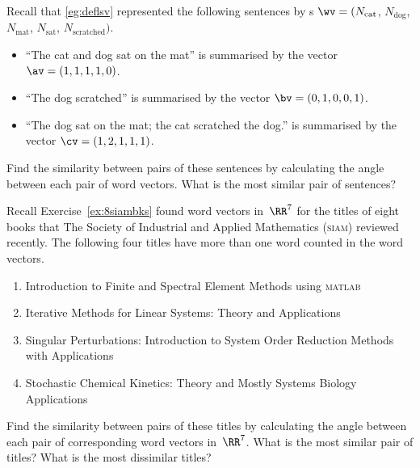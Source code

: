 \begin{exercise} \label{ex:} 
Recall that \autoref{eg:deflsv} represented the following sentences by s \(\wv=(N_{\text{cat}}\), \(N_{\text{dog}}\), \(N_{\text{mat}}\), \(N_{\text{sat}}\), \(N_{\text{scratched}})\).
\begin{itemize}
\item ``The cat and dog sat on the mat'' is summarised by the vector \(\av=(1,1,1,1,0)\).
\item ``The dog scratched'' is summarised by the vector \(\bv=(0,1,0,0,1)\).
\item  ``The dog sat on the mat; the cat scratched the dog.'' is summarised by the vector \(\cv=(1,2,1,1,1)\).
\end{itemize}
Find the similarity between pairs of these sentences by calculating the angle between each pair of word vectors.  
What is the most similar pair of sentences?

\end{exercise}



\begin{exercise} \label{ex:} 
Recall Exercise~\ref{ex:8siambks} found word vectors in~\(\RR^7\) for the titles of eight books that The Society of Industrial and Applied Mathematics (\textsc{siam}) reviewed recently.
The following four titles have more than one word counted in the word vectors.
\begin{enumerate}
\item Introduction to Finite and Spectral Element Methods using \textsc{matlab}
\item Iterative Methods for Linear Systems: Theory and Applications 
\item Singular Perturbations: Introduction to System Order Reduction Methods with Applications 
\item Stochastic Chemical Kinetics: Theory and Mostly Systems Biology Applications
\end{enumerate}
Find the similarity between pairs of these titles by calculating the angle between each pair of corresponding word vectors in~\(\RR^7\).  What is the most similar pair of titles?  What is the most dissimilar titles?

\end{exercise}



